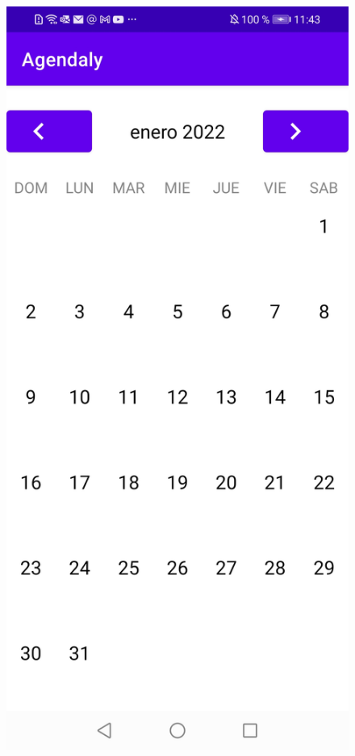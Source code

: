 \documentclass[a4paper,openright,12pt]{article}
\begin{document}
\begin{figure}
            \includegraphics[scale=0.05]{calendar1.jpg} \hfill

\end{figure}
\end{document}
